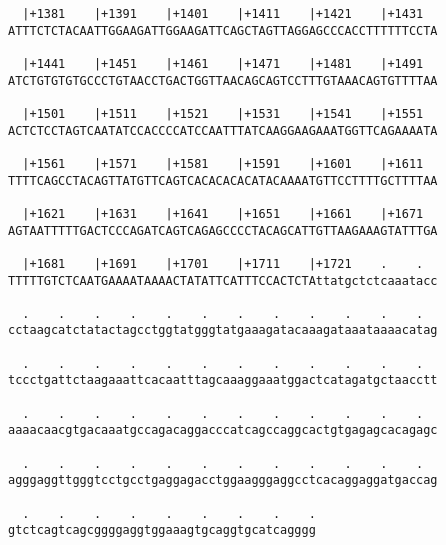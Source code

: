 \documentclass{article}
\begin{document}
\begin{Verbatim}
  |+1381    |+1391    |+1401    |+1411    |+1421    |+1431  
ATTTCTCTACAATTGGAAGATTGGAAGATTCAGCTAGTTAGGAGCCCACCTTTTTTCCTA
                                                            
  |+1441    |+1451    |+1461    |+1471    |+1481    |+1491  
ATCTGTGTGTGCCCTGTAACCTGACTGGTTAACAGCAGTCCTTTGTAAACAGTGTTTTAA
                                                            
  |+1501    |+1511    |+1521    |+1531    |+1541    |+1551  
ACTCTCCTAGTCAATATCCACCCCATCCAATTTATCAAGGAAGAAATGGTTCAGAAAATA
                                                            
  |+1561    |+1571    |+1581    |+1591    |+1601    |+1611  
TTTTCAGCCTACAGTTATGTTCAGTCACACACACATACAAAATGTTCCTTTTGCTTTTAA
                                                            
  |+1621    |+1631    |+1641    |+1651    |+1661    |+1671  
AGTAATTTTTGACTCCCAGATCAGTCAGAGCCCCTACAGCATTGTTAAGAAAGTATTTGA
                                                            
  |+1681    |+1691    |+1701    |+1711    |+1721    .    .  
TTTTTGTCTCAATGAAAATAAAACTATATTCATTTCCACTCTAttatgctctcaaatacc
                                                            
  .    .    .    .    .    .    .    .    .    .    .    .  
cctaagcatctatactagcctggtatgggtatgaaagatacaaagataaataaaacatag
                                                            
  .    .    .    .    .    .    .    .    .    .    .    .  
tccctgattctaagaaattcacaatttagcaaaggaaatggactcatagatgctaacctt
                                                            
  .    .    .    .    .    .    .    .    .    .    .    .  
aaaacaacgtgacaaatgccagacaggacccatcagccaggcactgtgagagcacagagc
                                                            
  .    .    .    .    .    .    .    .    .    .    .    .  
agggaggttgggtcctgcctgaggagacctggaagggaggcctcacaggaggatgaccag
                                                            
  .    .    .    .    .    .    .    .    .
gtctcagtcagcggggaggtggaaagtgcaggtgcatcagggg
                                           
                                           
\end{Verbatim}
\end{document}
